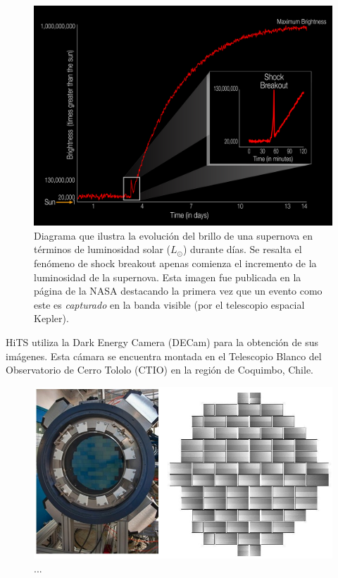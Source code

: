 

\begin{figure}
\centering
\includegraphics[scale=.25]{images/breakout}
\caption{Diagrama que ilustra la evoluci\'on del brillo de una supernova en t\'erminos de luminosidad solar ($L_{\odot}$) durante d\'ias. Se resalta el fen\'omeno de shock breakout apenas comienza el incremento de la luminosidad de la supernova. Esta imagen fue publicada en la p\'agina de la NASA destacando la primera vez que un evento como este es \textit{capturado} en la banda visible (por el telescopio espacial Kepler).}
\label{fig:f2}
\end{figure}

HiTS utiliza la Dark Energy Camera (DECam) para la obtenci\'on de sus im\'agenes. Esta c\'amara se encuentra montada en el Telescopio Blanco del Observatorio de Cerro Tololo (CTIO) en la regi\'on de Coquimbo, Chile. 
\bigskip

\begin{figure}
\centering
\includegraphics[scale=.5]{images/CCDs.jpg}
\caption{...}
\label{fig:f3}
\end{figure}

